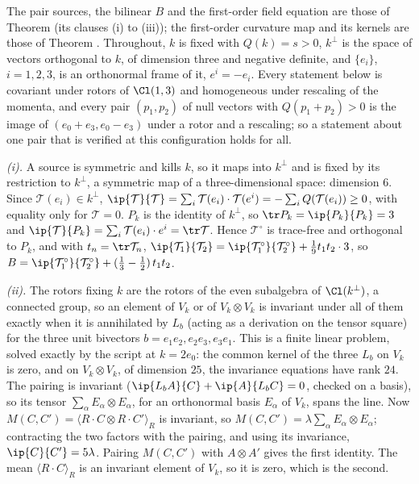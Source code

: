 The pair sources, the bilinear $B$ and the first-order field equation are those of Theorem  (its clauses (i) to (iii)); the first-order curvature map and its kernels are those of Theorem . Throughout, $k$ is fixed with $Q(k) = s > 0$, $k^{\perp}$ is the space of vectors orthogonal to $k$, of dimension three and negative definite, and $\{e_{i}\}$, $i = 1, 2, 3$, is an orthonormal frame of it, $e^{i} = -e_{i}$. Every statement below is covariant under rotors of $\Cl(1,3)$ and homogeneous under rescaling of the momenta, and every pair $(p_{1}, p_{2})$ of null vectors with $Q(p_{1} + p_{2}) > 0$ is the image of $(e_{0} + e_{3}, e_{0} - e_{3})$ under a rotor and a rescaling; so a statement about one pair that is verified at this configuration holds for all.

\emph{(i).} A source is symmetric and kills $k$, so it maps into $k^{\perp}$ and is fixed by its restriction to $k^{\perp}$, a symmetric map of a three-dimensional space: dimension $6$. Since $\mathcal{T}(e_{i}) \in k^{\perp}$, $\ip{\mathcal{T}}{\mathcal{T}} = \sum_{i} \mathcal{T}(e_{i}) \cdot \mathcal{T}(e^{i}) = -\sum_{i} Q(\mathcal{T}(e_{i})) \ge 0$, with equality only for $\mathcal{T} = 0$. $P_{k}$ is the identity of $k^{\perp}$, so $\tr P_{k} = \ip{P_{k}}{P_{k}} = 3$ and $\ip{\mathcal{T}}{P_{k}} = \sum_{i} \mathcal{T}(e_{i}) \cdot e^{i} = \tr\mathcal{T}$. Hence $\mathcal{T}^{\circ}$ is trace-free and orthogonal to $P_{k}$, and with $t_{n} = \tr\mathcal{T}_{n}$,
$\ip{\mathcal{T}_{1}}{\mathcal{T}_{2}} = \ip{\mathcal{T}_{1}^{\circ}}{\mathcal{T}_{2}^{\circ}} + \tfrac19 t_{1}t_{2} \cdot 3$, so $B = \ip{\mathcal{T}_{1}^{\circ}}{\mathcal{T}_{2}^{\circ}} + (\tfrac13 - \tfrac12)\,t_{1}t_{2}$.

\emph{(ii).} The rotors fixing $k$ are the rotors of the even subalgebra of $\Cl(k^{\perp})$, a connected group, so an element of $V_{k}$ or of $V_{k} \otimes V_{k}$ is invariant under all of them exactly when it is annihilated by $L_{b}$ (acting as a derivation on the tensor square) for the three unit bivectors $b = e_{1}e_{2}, e_{2}e_{3}, e_{3}e_{1}$. This is a finite linear problem, solved exactly by the script at $k = 2e_{0}$: the common kernel of the three $L_{b}$ on $V_{k}$ is zero, and on $V_{k} \otimes V_{k}$, of dimension $25$, the invariance equations have rank $24$. The pairing is invariant ($\ip{L_{b}A}{C} + \ip{A}{L_{b}C} = 0$, checked on a basis), so its tensor $\sum_{\alpha} E_{\alpha} \otimes E_{\alpha}$, for an orthonormal basis $E_{\alpha}$ of $V_{k}$, spans the line. Now $M(C, C') = \langle R \cdot C \otimes R \cdot C' \rangle_{R}$ is invariant, so $M(C, C') = \lambda\sum_{\alpha} E_{\alpha} \otimes E_{\alpha}$; contracting the two factors with the pairing, and using its invariance, $\ip{C}{C'} = 5\lambda$. Pairing $M(C, C')$ with $A \otimes A'$ gives the first identity. The mean $\langle R \cdot C \rangle_{R}$ is an invariant element of $V_{k}$, so it is zero, which is the second.

